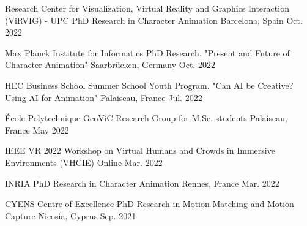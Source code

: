 

\begin{cventries}

\cvtalk
    {Research Center for Visualization, Virtual Reality and Graphics Interaction (ViRVIG) - UPC} %
    {PhD Research in Character Animation} %
    {Barcelona, Spain} %
    {Oct. 2022} %

\cvtalk
    {Max Planck Institute for Informatics} %
    {PhD Research. "Present and Future of Character Animation"} %
    {Saarbrücken, Germany} %
    {Oct. 2022} %

\cvtalk
    {HEC Business School} %
    {Summer School Youth Program. "Can AI be Creative? Using AI for Animation"} %
    {Palaiseau, France} %
    {Jul. 2022} %

\cvtalk
    {École Polytechnique} %
    {GeoViC Research Group for M.Sc. students} %
    {Palaiseau, France} %
    {May 2022} %

\cvtalk
    {IEEE VR 2022} %
    {Workshop on Virtual Humans and Crowds in Immersive Environments (VHCIE)} %
    {Online} %
    {Mar. 2022} %

\cvtalk
    {INRIA} %
    {PhD Research in Character Animation} %
    {Rennes, France} %
    {Mar. 2022} %

\cvtalk
    {CYENS Centre of Excellence} %
    {PhD Research in Motion Matching and Motion Capture} %
    {Nicosia, Cyprus} %
    {Sep. 2021} %



\end{cventries}
